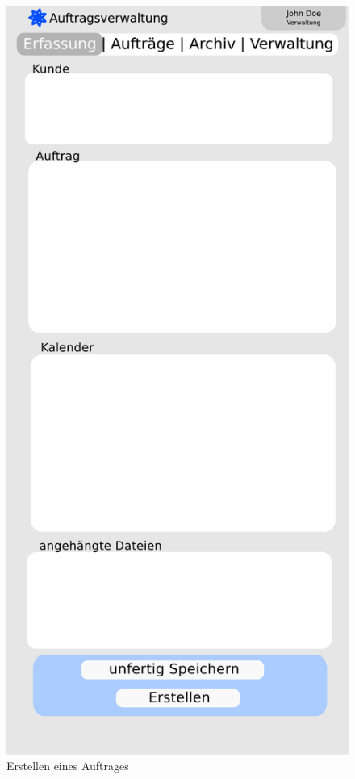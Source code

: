 \documentclass[ngerman, 12pt, pdftex]{scrartcl}[2006/07/30]
\begin{document}
\begin{figure}[p]
\centering
	\begin{minipage}{0.4\textwidth}
		\centering
		\includegraphics[scale=0.3]{./design/create_order.pdf}
		\caption{Erstellen eines Auftrages}

\end{minipage}
\end{figure}
\end{document}
